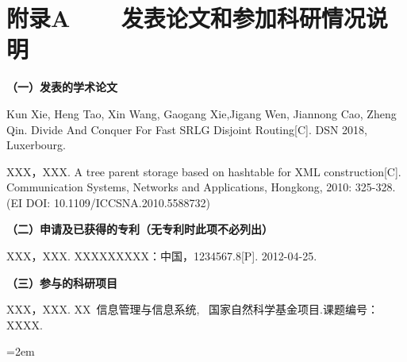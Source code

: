 
\chapter*{附录A~~~~发表论文和参加科研情况说明}
\setlength{\parindent}{0em}
\textbf{（一）发表的学术论文}
\begin{publist}
\item Kun Xie, Heng Tao, Xin Wang, Gaogang Xie,Jigang Wen, Jiannong Cao, Zheng Qin. Divide And Conquer For Fast SRLG Disjoint Routing[C]. DSN 2018, Luxerbourg.
\item XXX，XXX. A tree parent storage based on hashtable for XML construction[C]. Communication Systems, Networks and Applications, Hongkong, 2010: 325-328. (EI DOI: 10.1109/ICCSNA.2010.5588732)
\end{publist}

\vspace*{1em}
\textbf{（二）申请及已获得的专利（无专利时此项不必列出）}
\begin{publist}
\item XXX，XXX. XXXXXXXXX：中国，1234567.8[P]. 2012-04-25.
\end{publist}
\vspace*{1em}
\textbf{（三）参与的科研项目}
\begin{publist}
\item	XXX，XXX. XX~信息管理与信息系统, ~国家自然科学基金项目.课题编号：XXXX.
\end{publist}
\vfill
{}\hangindent=2em\noindent

\setlength{\parindent}{2em}

